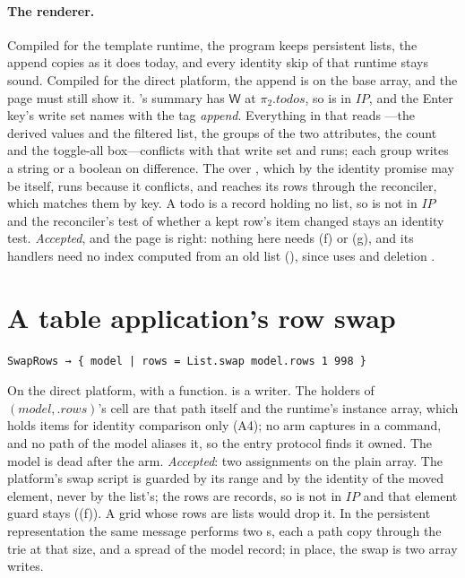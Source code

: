 \paragraph{The renderer.} Compiled for the template runtime, the program keeps persistent lists, the
append copies as it does today, and every identity skip of that runtime stays sound. Compiled for the
direct platform, the append is  on the base array, and the page must still show it.
's summary has $\mathsf{W}$ at $\pi_2.\mathit{todos}$, so  is in $\mathit{IP}$, and the
Enter key's write set names  with the tag \emph{append}. Everything in  that reads
---the derived values  and the filtered list, the groups of the two 
attributes, the count and the toggle-all box---conflicts with that write set and runs; each group writes a
string or a boolean on difference. The  over , which by the identity promise may be  itself, runs because it conflicts, and reaches
its rows through the reconciler, which matches them by key. A todo is a record holding no list, so
 is not in $\mathit{IP}$ and the reconciler's test of whether a kept row's item changed stays
an identity test. \emph{Accepted}, and the page is right: nothing here needs (f) or (g), and its handlers
need no index computed from an old list (), since  uses  and deletion .

\section{A table application's row swap}

\begin{Verbatim}
SwapRows → { model | rows = List.swap model.rows 1 998 }
\end{Verbatim}
On the direct platform, with  a function.  is a writer. The holders of
$(\mathit{model}, .\mathit{rows})$'s cell are that path itself and the runtime's instance array, which holds
items for identity comparison only (A4); no arm captures  in a command, and no path of the model
aliases it, so the entry protocol finds it owned. The model is dead after the arm. \emph{Accepted}: two
assignments on the plain array. The platform's swap script is guarded by its range and by the identity
of the moved element, never by the list's; the rows are records, so  is not in $\mathit{IP}$
and that element guard stays ((f)). A grid whose rows are lists would drop it.
In the persistent representation the same message performs two s, each a path copy through the
trie at that size, and a spread of the model record; in place, the swap is two array writes.

